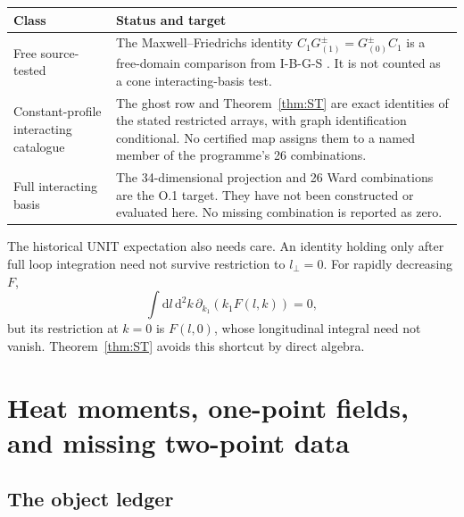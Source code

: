 \documentclass[11pt,a4paper]{article}
\newcommand{\dd}{\mathrm d}
\theoremstyle{plain}
\theoremstyle{definition}
\theoremstyle{remark}
\numberwithin{equation}{section}
\begin{document}
\begin{center}
\small
\begin{tabularx}{\linewidth}{@{}L{.25\linewidth}Y@{}}
\toprule
Class & Status and target\\
\midrule
Free source-tested &
The Maxwell--Friedrichs identity
\(C_1G^\pm_{(1)}=G^\pm_{(0)}C_1\) is a free-domain comparison
from I-B-G-S \cite{CheungIBGS}. It is not counted as a cone
interacting-basis test.\\[3pt]

Constant-profile interacting catalogue &
The ghost row and Theorem~\ref{thm:ST} are exact identities of
the stated restricted arrays, with graph identification
conditional. No certified map assigns them to a named member
of the programme's 26 combinations.\\[3pt]

Full interacting basis &
The 34-dimensional projection and 26 Ward combinations are the
O.1 target. They have not been constructed or evaluated here.
No missing combination is reported as zero.\\
\bottomrule
\end{tabularx}
\end{center}

The historical UNIT expectation also needs care. An identity
holding only after full loop integration need not survive
restriction to \(l_\perp=0\). For rapidly decreasing \(F\),
\[
 \int\dd l\,\dd^2k\,
       \partial_{k_1}(k_1F(l,k))=0,
\]
but its restriction at \(k=0\) is \(F(l,0)\), whose longitudinal
integral need not vanish.
Theorem~\ref{thm:ST} avoids this shortcut by direct algebra.

\section{Heat moments, one-point fields, and missing two-point data}
\label{sec:missing}

\subsection{The object ledger}
\end{document}
